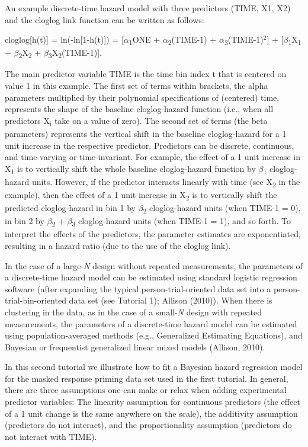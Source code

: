 \documentclass[
  man,floatsintext]{apa6}
\begin{document}
An example discrete-time hazard model with three predictors (TIME, X1, X2) and the cloglog link function can be written as follows:

cloglog{[}h(t){]} = ln(-ln{[}1-h(t){]}) = {[}\(\alpha\)\textsubscript{1}ONE + \(\alpha\)\textsubscript{2}(TIME-1) + \(\alpha\)\textsubscript{3}(TIME-1)\(^2\){]} + {[}\(\beta\)\textsubscript{1}X\textsubscript{1} + \(\beta\)\textsubscript{2}X\textsubscript{2} + \(\beta\)\textsubscript{3}X\textsubscript{2}(TIME-1){]}.

The main predictor variable TIME is the time bin index t that is centered on value 1 in this example. The first set of terms within brackets, the alpha parameters multiplied by their polynomial specifications of (centered) time, represents the shape of the baseline cloglog-hazard function (i.e., when all predictors X\textsubscript{i} take on a value of zero). The second set of terms (the beta parameters) represents the vertical shift in the baseline cloglog-hazard for a 1 unit increase in the respective predictor. Predictors can be discrete, continuous, and time-varying or time-invariant. For example, the effect of a 1 unit increase in X\textsubscript{1} is to vertically shift the whole baseline cloglog-hazard function by \(\beta\)\textsubscript{1} cloglog-hazard units. However, if the predictor interacts linearly with time (see X\textsubscript{2} in the example), then the effect of a 1 unit increase in X\textsubscript{2} is to vertically shift the predicted cloglog-hazard in bin 1 by \(\beta\)\textsubscript{2} cloglog-hazard units (when TIME-1 = 0), in bin 2 by \(\beta\)\textsubscript{2} + \(\beta\)\textsubscript{3} cloglog-hazard units (when TIME-1 = 1), and so forth. To interpret the effects of the predictors, the parameter estimates are exponentiated, resulting in a hazard ratio (due to the use of the cloglog link).

In the case of a large-\emph{N} design without repeated measurements, the parameters of a discrete-time hazard model can be estimated using standard logistic regression software (after expanding the typical person-trial-oriented data set into a person-trial-bin-oriented data set (see Tutorial 1); Allison (2010)). When there is clustering in the data, as in the case of a small-\emph{N} design with repeated measurements, the parameters of a discrete-time hazard model can be estimated using population-averaged methods (e.g., Generalized Estimating Equations), and Bayesian or frequentist generalized linear mixed models (Allison, 2010).

In this second tutorial we illustrate how to fit a Bayesian hazard regression model for the masked response priming data set used in the first tutorial.
In general, there are three assumptions one can make or relax when adding experimental predictor variables: The linearity assumption for continuous predictors (the effect of a 1 unit change is the same anywhere on the scale), the additivity assumption (predictors do not interact), and the proportionality assumption (predictors do not interact with TIME).
\end{document}
